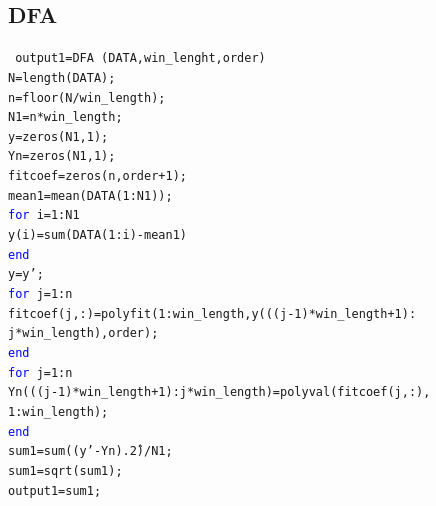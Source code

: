 \documentclass[letterpaper,titlepage,12pt,draft]{report}
\begin{document}
\subsection{DFA}

{\tt \setlength{\parindent}{0pt}{\textcolor{blue}{function}} output1=DFA (DATA,win\_lenght,order)\\
N=length(DATA);\\
n=floor(N/win\_length);\\
N1=n*win\_length;\\
y=zeros(N1,1);\\
Yn=zeros(N1,1);\\
fitcoef=zeros(n,order+1);\\
mean1=mean(DATA(1:N1));\\
\textcolor{blue}{for} i=1:N1\\
y(i)=sum(DATA(1:i)-mean1)\\
\textcolor{blue}{end}\\
y=y';\\
\textcolor{blue}{for} j=1:n\\
fitcoef(j,:)=polyfit(1:win\_length,y(((j-1)*win\_length+1):\\
j*win\_length),order);\\
\textcolor{blue}{end}\\
\textcolor{blue}{for} j=1:n\\
Yn(((j-1)*win\_length+1):j*win\_length)=polyval(fitcoef(j,:),\\
1:win\_length);\\
\textcolor{blue}{end}\\
sum1=sum((y'-Yn).\^2)/N1;\\
sum1=sqrt(sum1);\\
output1=sum1;\\
}
\end{document}
